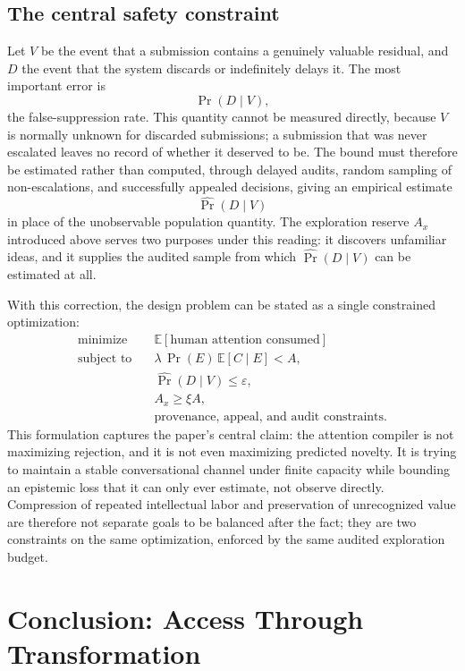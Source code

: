 \documentclass[11pt]{article}
\begin{document}
\subsection{The central safety constraint}

Let $V$ be the event that a submission contains a genuinely valuable residual, and $D$ the event that the system discards or indefinitely delays it. The most important error is
\[
\Pr(D \mid V),
\]
the false-suppression rate. This quantity cannot be measured directly, because $V$ is normally unknown for discarded submissions; a submission that was never escalated leaves no record of whether it deserved to be. The bound must therefore be estimated rather than computed, through delayed audits, random sampling of non-escalations, and successfully appealed decisions, giving an empirical estimate
\[
\widehat{\Pr}(D \mid V)
\]
in place of the unobservable population quantity. The exploration reserve $A_x$ introduced above serves two purposes under this reading: it discovers unfamiliar ideas, and it supplies the audited sample from which $\widehat{\Pr}(D \mid V)$ can be estimated at all.

With this correction, the design problem can be stated as a single constrained optimization:
\[
\begin{aligned}
\text{minimize} \quad & \mathbb{E}[\text{human attention consumed}] \\
\text{subject to} \quad & \lambda\,\Pr(E)\,\mathbb{E}[C \mid E] < A, \\
& \widehat{\Pr}(D \mid V) \leq \varepsilon, \\
& A_x \geq \xi A, \\
& \text{provenance, appeal, and audit constraints.}
\end{aligned}
\]
This formulation captures the paper's central claim: the attention compiler is not maximizing rejection, and it is not even maximizing predicted novelty. It is trying to maintain a stable conversational channel under finite capacity while bounding an epistemic loss that it can only ever estimate, not observe directly. Compression of repeated intellectual labor and preservation of unrecognized value are therefore not separate goals to be balanced after the fact; they are two constraints on the same optimization, enforced by the same audited exploration budget.

\section{Conclusion: Access Through Transformation}
\end{document}
